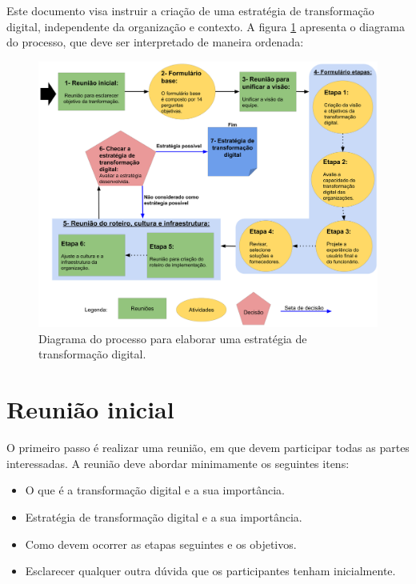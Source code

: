 Este documento visa instruir a criação de uma estratégia de transformação digital, independente da organização e contexto. A figura \ref{fig:mapETD} apresenta o diagrama do processo, que deve ser interpretado de maneira ordenada:

\begin{figure}[!htpb]
    \centering
    \includegraphics[scale=0.18]{figuras/mapETD.png}
    \caption{Diagrama do processo para elaborar uma estratégia de transformação digital.}
    \label{fig:mapETD}
\end{figure}



\section{Reunião inicial}\label{sec:reuniaoInicial}

O primeiro passo é realizar uma reunião, em que devem participar todas as partes interessadas. A reunião deve abordar minimamente os seguintes itens:

\begin{itemize}
    \item O que é a transformação digital e a sua importância.
    \item Estratégia de transformação digital e a sua importância.
    \item Como devem ocorrer as etapas seguintes e os objetivos.
    \item Esclarecer qualquer outra dúvida que os participantes tenham inicialmente.
\end{itemize}

